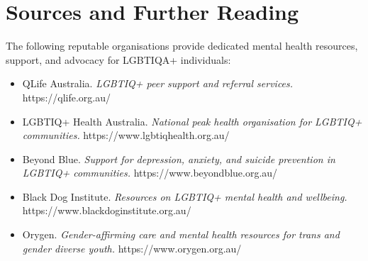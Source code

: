 \section*{Sources and Further Reading}
The following reputable organisations provide dedicated mental health resources, support, and advocacy for LGBTIQA+ individuals:
\begin{itemize}
    \item QLife Australia. \textit{LGBTIQ+ peer support and referral services.} https://qlife.org.au/
    \item LGBTIQ+ Health Australia. \textit{National peak health organisation for LGBTIQ+ communities.} https://www.lgbtiqhealth.org.au/
    \item Beyond Blue. \textit{Support for depression, anxiety, and suicide prevention in LGBTIQ+ communities.} https://www.beyondblue.org.au/
    \item Black Dog Institute. \textit{Resources on LGBTIQ+ mental health and wellbeing.} https://www.blackdoginstitute.org.au/
    \item Orygen. \textit{Gender-affirming care and mental health resources for trans and gender diverse youth.} https://www.orygen.org.au/
\end{itemize}
